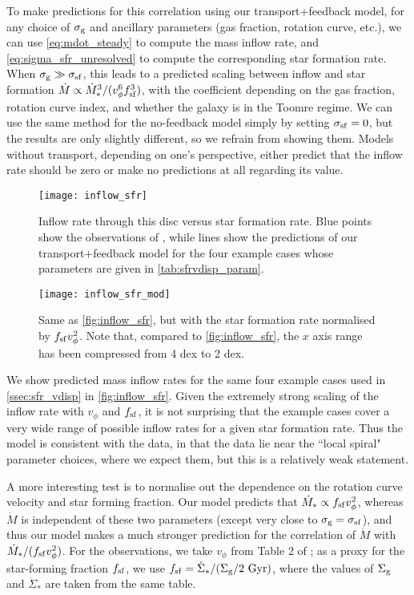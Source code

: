 \documentclass[useAMS,usenatbib]{mn2e}
\begin{document}
To make predictions for this correlation using our transport+feedback model, for any choice of $\sigma_{\rm g}$ and ancillary parameters (gas fraction, rotation curve, etc.), we can use \autoref{eq:mdot_steady} to compute the mass inflow rate, and \autoref{eq:sigma_sfr_unresolved} to compute the corresponding star formation rate. When $\sigma_{\rm g} \gg \sigma_{\rm sf}$, this leads to a predicted scaling between inflow and star formation $\dot{M} \propto \dot{M}_*^3/(v_\phi^6 f_{\rm sf}^3)$, with the coefficient depending on the gas fraction, rotation curve index, and whether the galaxy is in the Toomre regime. We can use the same method for the no-feedback model simply by setting $\sigma_{\rm sf} = 0$, but the results are only slightly different, so we refrain from showing them. Models without transport, depending on one's perspective, either predict that the inflow rate should be zero or make no predictions at all regarding its value.

\begin{figure}
\texttt{[image: inflow\_sfr]}
\caption{
\label{fig:inflow_sfr}
Inflow rate through this disc versus star formation rate. Blue points show the observations of \citet{schmidt16a}, while lines show the predictions of our transport+feedback model for the four example cases whose parameters are given in \autoref{tab:sfrvdisp_param}.
}
\end{figure}

\begin{figure}
\texttt{[image: inflow\_sfr\_mod]}
\caption{
\label{fig:inflow_sfr_mod}
Same as \autoref{fig:inflow_sfr}, but with the star formation rate normalised by $f_{\rm sf} v_\phi^2$. Note that, compared to \autoref{fig:inflow_sfr}, the $x$ axis range has been compressed from 4 dex to 2 dex.
}
\end{figure}

We show predicted mass inflow rates for the same four example cases used in \autoref{ssec:sfr_vdisp} in \autoref{fig:inflow_sfr}. Given the extremely strong scaling of the inflow rate with $v_\phi$ and $f_{\rm sf}$, it is not surprising that the example cases cover a very wide range of possible inflow rates for a given star formation rate. Thus the model is consistent with the data, in that the data lie near the ``local spiral" parameter choices, where we expect them, but this is a relatively weak statement.

A more interesting test is to normalise out the dependence on the rotation curve velocity and star forming fraction. Our model predicts that $\dot{M}_* \propto f_{\rm sf} v_\phi^2$, whereas $\dot{M}$ is independent of these two parameters (except very close to $\sigma_{\rm g} = \sigma_{\rm sf}$), and thus our model makes a much stronger prediction for the correlation of $\dot{M}$ with $\dot{M}_*/(f_{\rm sf} v_\phi^2)$. For the observations, we take $v_{\phi}$ from Table 2 of \citet{leroy13a}; as a proxy for the star-forming fraction $f_{\rm sf}$, we use $f_{\rm sf} = \dot{\Sigma}_* / (\Sigma_{\rm g}/2\mbox{ Gyr})$, where the values of $\Sigma_{\rm g}$ and $\dot{\Sigma}_*$ are taken from the same table.
\end{document}
